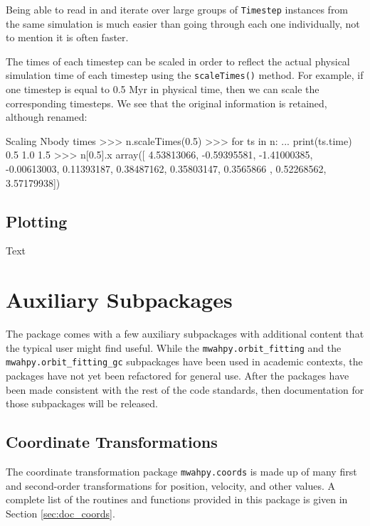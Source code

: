 \documentclass{article}
\begin{document}
Being able to read in and iterate over large groups of \verb!Timestep! instances from the same simulation is much easier than going through each one individually, not to mention it is often faster. 

The times of each timestep can be scaled in order to reflect the actual physical simulation time of each timestep using the \verb!scaleTimes()! method. For example, if one timestep is equal to 0.5 Myr in physical time, then we can scale the corresponding timesteps. We see that the original information is retained, although renamed: \\

\begin{codelisting}{Scaling Nbody times}
>>> n.scaleTimes(0.5)
>>> for ts in n:
...     print(ts.time)
0.5
1.0
1.5
>>> n[0.5].x
array([ 4.53813066, -0.59395581, -1.41000385, -0.00613003,  0.11393187,
        0.38487162,  0.35803147,  0.3565866 ,  0.52268562,  3.57179938])
\end{codelisting}

\subsection{Plotting}

Text

\newpage

\section{Auxiliary Subpackages}

The \mwahpy package comes with a few auxiliary subpackages with additional content that the typical user might find useful. While the \verb!mwahpy.orbit_fitting! and the \verb!mwahpy.orbit_fitting_gc! subpackages have been used in academic contexts, the packages have not yet been refactored for general use. After the packages have been made consistent with the rest of the \mwahpy code standards, then documentation for those subpackages will be released. 

\subsection{Coordinate Transformations}

The coordinate transformation package \verb!mwahpy.coords! is made up of many first and second-order transformations for position, velocity, and other values. A complete list of the routines and functions provided in this package is given in Section \ref{sec:doc_coords}. 
\end{document}
